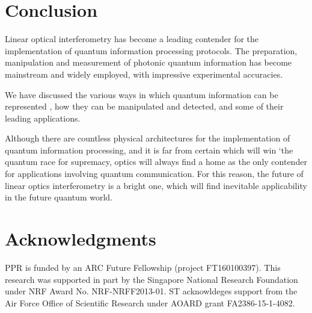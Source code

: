 \documentclass[times,final]{elsarticle}
\newcommand{\sihui}[1]{{\color{Orchid}{#1}}}
\begin{document}
\section{Conclusion}

Linear optical interferometry has become a leading contender for the implementation of quantum information processing protocols. The preparation, manipulation and measurement of photonic quantum information has become mainstream and widely employed, with impressive experimental accuracies.

We have discussed the various ways in which quantum information can be represented \sihui{in photonics}, how they can be manipulated and detected, and some of their leading applications.

Although there are countless physical architectures for the implementation of quantum information processing, and it is far from certain which will win `the quantum race for supremacy, optics will always find a home as the only contender for applications involving quantum communication. For this reason, the future of linear optics interferometry is a bright one, which will find inevitable applicability in the future quantum world.

%
%

\section*{Acknowledgments}
PPR is funded by an ARC Future Fellowship (project FT160100397). This research was supported in part by the Singapore National Research Foundation under NRF Award No. NRF-NRFF2013-01. ST acknowldeges support from the Air Force Office of Scientific Research under AOARD grant FA2386-15-1-4082.

%
%



\end{document}
